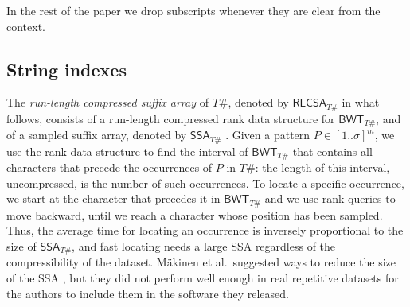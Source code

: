 \documentclass[a4paper,UKenglish]{lipics-v2016}
\newcommand{\RLCSA}{\ensuremath{\mathsf{RLCSA}}}
\newcommand{\BWT}{\ensuremath{\mathsf{BWT}}}
\newcommand{\SSA}{\ensuremath{\mathsf{SSA}}}
\begin{document}
In the rest of the paper we drop subscripts whenever they are clear from the context.









































\subsection{String indexes} \label{sec:stringIndexes}

The \emph{run-length compressed suffix array} of $T\#$, denoted by $\RLCSA_{T\#}$ in what follows, consists of a run-length compressed rank data structure for $\BWT_{T\#}$, and of a sampled suffix array, denoted by $\SSA_{T\#}$ \cite{MakinenNSV10}. Given a pattern $P \in [1..\sigma]^m$, we use the rank data structure to find the interval of $\BWT_{T\#}$ that contains all characters that precede the occurrences of $P$ in $T\#$: the length of this interval, uncompressed, is the number of such occurrences. To locate a specific occurrence, we start at the character that precedes it in $\BWT_{T\#}$ and we use rank queries to move backward, until we reach a character whose position has been sampled. Thus, the average time for locating an occurrence is inversely proportional to the size of $\SSA_{T\#}$, and fast locating needs a large SSA regardless of the compressibility of the dataset. M\"akinen et al.\ suggested ways to reduce the size of the SSA \cite{MakinenNSV10}, but they did not perform well enough in real repetitive datasets for the authors to include them in the software they released.
\end{document}
